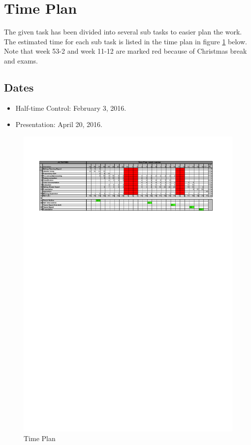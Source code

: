 \documentclass{article}
\begin{document}
\section{Time Plan}
The given task has been divided into several sub tasks to easier plan the work. The estimated time for each sub task is listed in the time plan in figure \ref{fig:timeplan} below.
Note that week 53-2 and week 11-12 are marked red because of Christmas break and exams.


\subsection{Dates}
\begin{itemize}
\item Half-time Control: February 3, 2016.
\item Presentation: April 20, 2016.
\end{itemize}

\begin{figure}[h!]
    \centering
    \includegraphics[height=9 cm, width=18 cm, angle=90]{fig/Tidplan}
    \caption{Time Plan}
    \label{fig:timeplan}
\end{figure}
\end{document}
